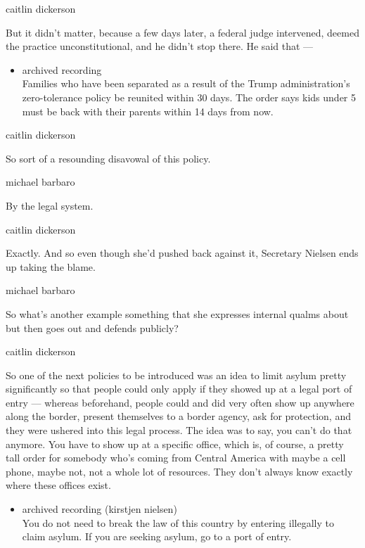 caitlin dickerson

But it didn't matter, because a few days later, a federal judge
intervened, deemed the practice unconstitutional, and he didn't stop
there. He said that ---

\begin{itemize}
\tightlist
\item
  archived recording\\
  Families who have been separated as a result of the Trump
  administration's zero-tolerance policy be reunited within 30 days. The
  order says kids under 5 must be back with their parents within 14 days
  from now.
\end{itemize}

caitlin dickerson

So sort of a resounding disavowal of this policy.

michael barbaro

By the legal system.

caitlin dickerson

Exactly. And so even though she'd pushed back against it, Secretary
Nielsen ends up taking the blame.

michael barbaro

So what's another example something that she expresses internal qualms
about but then goes out and defends publicly?

caitlin dickerson

So one of the next policies to be introduced was an idea to limit asylum
pretty significantly so that people could only apply if they showed up
at a legal port of entry --- whereas beforehand, people could and did
very often show up anywhere along the border, present themselves to a
border agency, ask for protection, and they were ushered into this legal
process. The idea was to say, you can't do that anymore. You have to
show up at a specific office, which is, of course, a pretty tall order
for somebody who's coming from Central America with maybe a cell phone,
maybe not, not a whole lot of resources. They don't always know exactly
where these offices exist.

\begin{itemize}
\tightlist
\item
  archived recording (kirstjen nielsen)\\
  You do not need to break the law of this country by entering illegally
  to claim asylum. If you are seeking asylum, go to a port of entry.
\end{itemize}

